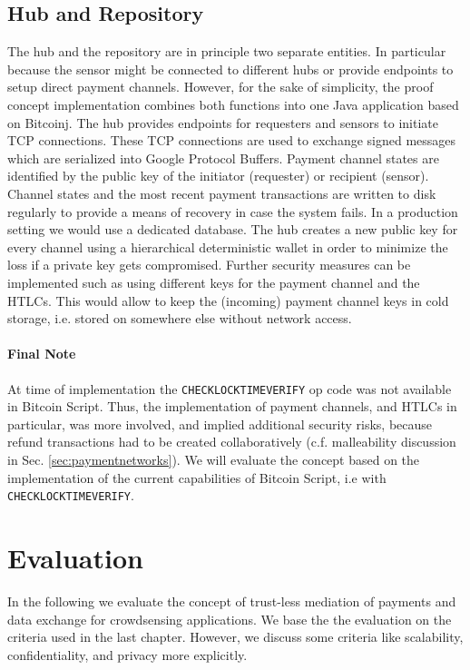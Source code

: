\subsection{Hub and Repository}
The hub and the repository are in principle two separate entities. In particular because the sensor might be connected to different hubs or provide endpoints to setup direct payment channels. However, for the sake of simplicity, the proof concept implementation combines both functions into one Java application based on Bitcoinj. The hub provides endpoints for requesters and sensors to initiate \ac{TCP} connections. These \ac{TCP} connections are used to exchange signed messages which are serialized into Google Protocol Buffers. Payment channel states are identified by the public key of the initiator (requester) or recipient (sensor). Channel states and the most recent payment transactions are written to disk regularly to provide a means of recovery in case the system fails. In a production setting we would use a dedicated database. 
The hub creates a new public key for every channel using a hierarchical deterministic wallet \parencite{bip32} in order to minimize the loss if a private key gets compromised. Further security measures can be implemented such as using different keys for the payment channel and the \ac{HTLC}s. This would allow to keep the (incoming) payment channel keys in cold storage, i.e. stored on somewhere else without network access.
 
\paragraph{Final Note} At time of implementation the \texttt{CHECKLOCKTIMEVERIFY} op code \parencite{bip65} was not available in Bitcoin Script. Thus, the implementation of payment channels, and \ac{HTLC}s in particular, was more involved, and implied additional security risks, because refund transactions had to be created collaboratively (c.f. malleability discussion in Sec. \ref{sec:paymentnetworks}). We will evaluate the concept based on the implementation of the current capabilities of Bitcoin Script, i.e with \texttt{CHECKLOCKTIMEVERIFY}.

\section{Evaluation}
\label{sec:trust-lessevaluation}

In the following we evaluate the concept of trust-less mediation of payments and data exchange for crowdsensing applications. We base the the evaluation on the criteria used in the last chapter. However, we discuss some criteria like scalability, confidentiality, and privacy more explicitly.  

